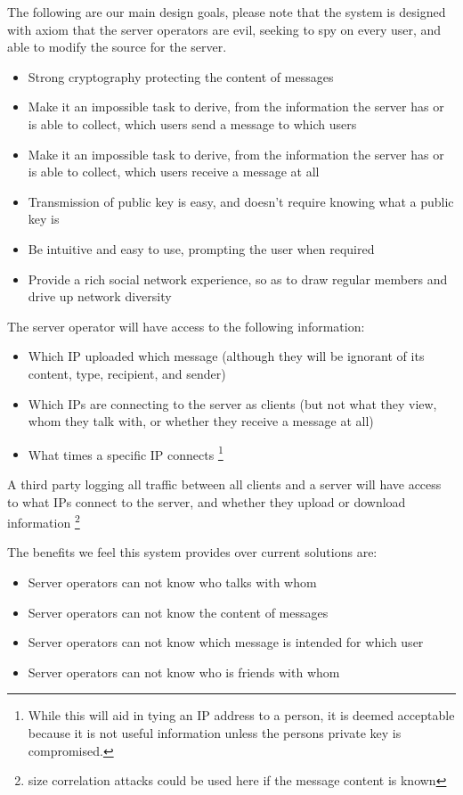 The following are our main design goals, please note that the system is designed
with axiom that the server operators are evil, seeking to spy on every user, and
able to modify the source for the server.
\begin{itemize}
\item Strong cryptography protecting the content of messages
\item Make it an impossible task to derive, from the information the server has
      or is able to collect, which users send a message to which users
\item Make it an impossible task to derive, from the information the server has
      or is able to collect, which users receive a message at all
\item Transmission of public key is easy, and doesn't require knowing what a
      public key is
\item Be intuitive and easy to use, prompting the user when required
\item Provide a rich social network experience, so as to draw regular members
      and drive up network diversity
\end{itemize}

The server operator will have access to the following information:
\begin{itemize}
\item Which IP uploaded which message (although they will be ignorant of its
content, type, recipient, and sender)
\item Which IPs are connecting to the server as clients (but not what they view,
whom they talk with, or whether they receive a message at all)
\item What times a specific IP connects \footnote {While this will aid in tying
an IP address to a person, it is deemed acceptable because it is not useful
information unless the persons private key is compromised.}
\end{itemize}

A third party logging all traffic between all clients and a server will have
access to  what IPs connect to the
server, and whether they upload or download information \footnote{size
correlation attacks could be used here if the message content is known}

The benefits we feel this system provides over current solutions are:
\begin{itemize}
\item Server operators can not know who talks with whom
\item Server operators can not know the content of messages
\item Server operators can not know which message is intended for which user
\item Server operators can not know who is friends with whom
\end{itemize}

